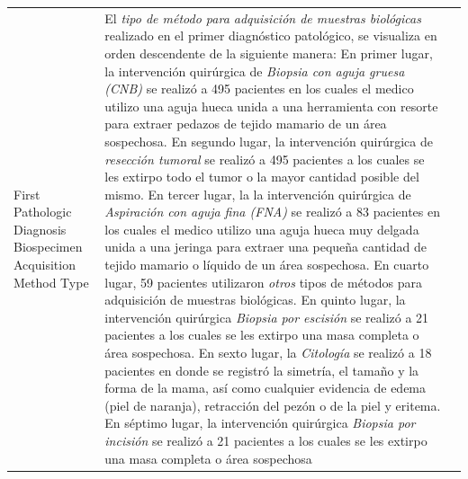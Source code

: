 \begin{table}[!htb]
	\footnotesize
	\begin{threeparttable}
		\begin{tabular}{p{2.5cm} p{7.5cm} p{6.5cm}} \toprule
			First Pathologic Diagnosis Biospecimen Acquisition Method Type
			& El \textit{tipo de método para adquisición de muestras biológicas} realizado en el primer diagnóstico patológico, se visualiza en orden descendente de la siguiente manera: En primer lugar, la intervención quirúrgica de \textit{Biopsia con aguja gruesa (CNB)} se realizó a 495 pacientes en los cuales el medico utilizo una aguja hueca unida a una herramienta con resorte para extraer pedazos de tejido mamario de un área sospechosa. En segundo lugar, la intervención quirúrgica de \textit{resección tumoral} se realizó a 495 pacientes a los cuales se les extirpo todo el tumor o la mayor cantidad posible del mismo. En tercer lugar, la la intervención quirúrgica de \textit{Aspiración con aguja fina (FNA)} se realizó a 83 pacientes en los cuales el medico utilizo una aguja hueca muy delgada unida a una jeringa para extraer una pequeña cantidad de tejido mamario o líquido de un área sospechosa. En cuarto lugar, 59 pacientes utilizaron \textit{otros} tipos de métodos para adquisición de muestras biológicas. En quinto lugar, la intervención quirúrgica \textit{Biopsia por escisión} se realizó a 21 pacientes a los cuales se les extirpo una masa completa o área sospechosa. En sexto lugar, la \textit{Citología} se realizó a 18 pacientes en donde se registró la simetría, el tamaño y la forma de la mama, así como cualquier evidencia de edema (piel de naranja), retracción del pezón o de la piel y eritema. En séptimo lugar, la intervención quirúrgica \textit{Biopsia por incisión} se realizó a 21 pacientes a los cuales se les extirpo una masa completa o área sospechosa

\end{tabular}
\end{threeparttable}
\end{table}
